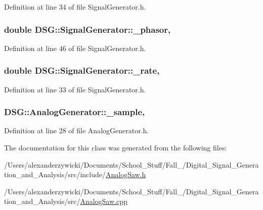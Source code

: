 Definition at line 34 of file Signal\+Generator.\+h.

\hypertarget{classDSG_1_1SignalGenerator_ac2271b582bf699275f077ecb642a8cd9}{
\subsubsection[{\+\_\+phasor}]{\setlength{\rightskip}{0pt plus 5cm}double D\+S\+G\+::\+Signal\+Generator\+::\+\_\+phasor\hspace{0.3cm}{\ttfamily [protected]}, {\ttfamily [inherited]}}}\label{classDSG_1_1SignalGenerator_ac2271b582bf699275f077ecb642a8cd9}


Definition at line 46 of file Signal\+Generator.\+h.

\hypertarget{classDSG_1_1SignalGenerator_aa10f6c85d9adee901139ea7fb346f39d}{
\subsubsection[{\+\_\+rate}]{\setlength{\rightskip}{0pt plus 5cm}double D\+S\+G\+::\+Signal\+Generator\+::\+\_\+rate\hspace{0.3cm}{\ttfamily [protected]}, {\ttfamily [inherited]}}}\label{classDSG_1_1SignalGenerator_aa10f6c85d9adee901139ea7fb346f39d}


Definition at line 33 of file Signal\+Generator.\+h.

\hypertarget{classDSG_1_1AnalogGenerator_ac88ad591cac37f636c2f7b460480bef9}{
\subsubsection[{\+\_\+sample}]{ D\+S\+G\+::\+Analog\+Generator\+::\+\_\+sample\hspace{0.3cm}{\ttfamily [protected]}, {\ttfamily [inherited]}}}\label{classDSG_1_1AnalogGenerator_ac88ad591cac37f636c2f7b460480bef9}


Definition at line 28 of file Analog\+Generator.\+h.



The documentation for this class was generated from the following files\+:\begin{DoxyCompactItemize}
\item 
/\+Users/alexanderzywicki/\+Documents/\+School\+\_\+\+Stuff/\+Fall\+\_/\+Digital\+\_\+\+Signal\+\_\+\+Generation\+\_\+and\+\_\+\+Analysis/src/include/\hyperlink{AnalogSaw_8h}{Analog\+Saw.\+h}\item 
/\+Users/alexanderzywicki/\+Documents/\+School\+\_\+\+Stuff/\+Fall\+\_/\+Digital\+\_\+\+Signal\+\_\+\+Generation\+\_\+and\+\_\+\+Analysis/src/\hyperlink{AnalogSaw_8cpp}{Analog\+Saw.\+cpp}\end{DoxyCompactItemize}

